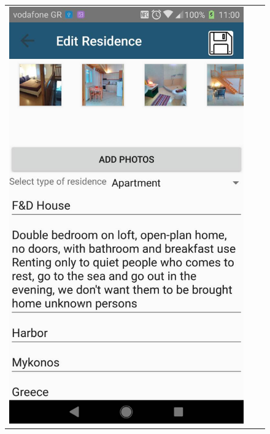 \documentclass[12pt]{article}
\begin{document}
	\begin{center}
		\begin{figure}
			\begin{tabular}{c c c}
				
				\includegraphics[scale=0.17, keepaspectratio]{27-editResidence.jpg}  
				&

\end{tabular}
\end{figure}
\end{center}
\end{document}
